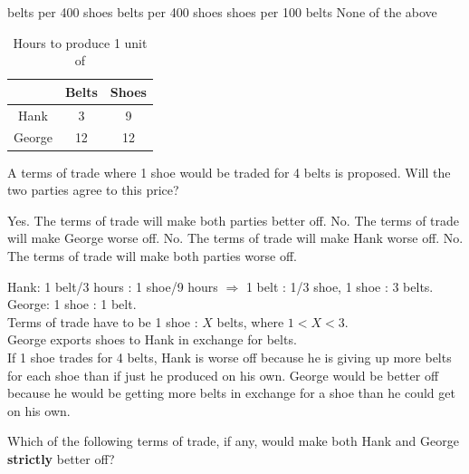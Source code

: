 \documentclass[addpoints,11pt]{exam}
\theoremstyle{definition}
\begin{document}
\begin{questions}
\begin{choices}
	 belts per 400 shoes
	 belts per 400 shoes
	 shoes per 100 belts
	\choice None of the above
\end{choices}		



\begin{table}[H]
	\caption{Hours to produce 1 unit of}
	\centering
	\begin{tabular}{  c| c c} 
		
		& Belts & Shoes \\
		\hline
		Hank & 3 & 9 \\
		George & 12 & 12 \\
	\end{tabular}
	\label{tab3}
\end{table}

\newpage

\question \label{blah5} A terms of trade where 1 shoe would be traded for 4 belts is proposed. Will the two parties agree to this price?

\begin{choices}
	\choice Yes. The terms of trade will make both parties better off.
	\choice No. The terms of trade will make George worse off.
	\CorrectChoice No. The terms of trade will make Hank worse off.
	\choice No. The terms of trade will make both parties worse off.
\end{choices}

\begin{solution}
	Hank: 1 belt/3 hours : 1 shoe/9 hours $\Rightarrow$ 1 belt : 1/3 shoe, 1 shoe : 3 belts. \\
	George: 1 shoe : 1 belt. \\
	Terms of trade have to be 1 shoe : $X$ belts, where $1<X<3$. \\
	George exports shoes to Hank in exchange for belts. \\
	If 1 shoe trades for 4 belts, Hank is worse off because he is giving up more belts for each shoe than if just he produced on his own. George would be better off because he would be getting more belts in exchange for a shoe than he could get on his own.
\end{solution}

\question \label{blah6} Which of the following terms of trade, if any, would make both Hank and George \textbf{strictly} better off?


\end{questions}
\end{document}
